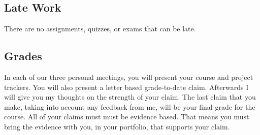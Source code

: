 \documentclass[12pt]{amsart}
\begin{document}
\subsection{Late Work} There are no assignments, quizzes, or exams that can be late.

\subsection{Grades} In each of our three personal meetings, you will present your course and project trackers. You will also present a letter based grade-to-date claim. Afterwards I will give you my thoughts on the strength of your claim. The last claim that you make, taking into account any feedback from me, will be your final grade for the course. All of your claims must must be evidence based. That means you must bring the evidence with you, in your portfolio, that supports your claim. 
\end{document}
